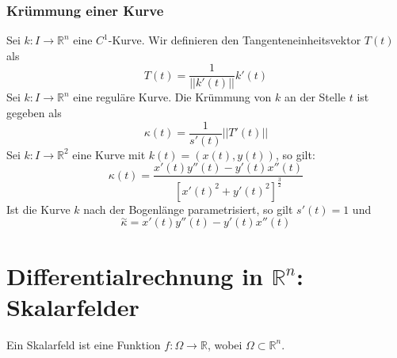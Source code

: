 \documentclass[a4paper,twocolumn,10pt]{article}
\begin{document}
\subsubsection{Krümmung einer Kurve}
Sei $k:I\rightarrow\mathbb{R}^n$ eine $C^1$-Kurve. Wir definieren den Tangenteneinheitsvektor $T(t)$ als
\begin{equation*}
T(t)=\frac{1}{||k'(t)||}k'(t)
\end{equation*}
Sei $k:I\rightarrow\mathbb{R}^n$ eine reguläre Kurve. Die Krümmung von $k$ an der Stelle $t$ ist gegeben als
\begin{equation*}
\kappa(t)=\frac{1}{s'(t)}||T'(t)||
\end{equation*}
Sei $k:I\rightarrow\mathbb{R}^2$ eine Kurve mit $k(t)=(x(t),y(t))$, so gilt:
\begin{equation*}
\kappa(t)=\frac{x'(t)y''(t)-y'(t)x''(t)}{[x'(t)^2+y'(t)^2]^{\frac{3}{2}}}
\end{equation*}
Ist die Kurve $k$ nach der Bogenlänge parametrisiert, so gilt $s'(t)=1$ und
\begin{equation*}
\overset{\sim}{\kappa}=x'(t)y''(t)-y'(t)x''(t)
\end{equation*}

\section{Differentialrechnung in $\mathbb{R}^n$: Skalarfelder}
Ein Skalarfeld ist eine Funktion $f:\Omega\rightarrow\mathbb{R}$, wobei $\Omega\subset\mathbb{R}^n$.
\end{document}
